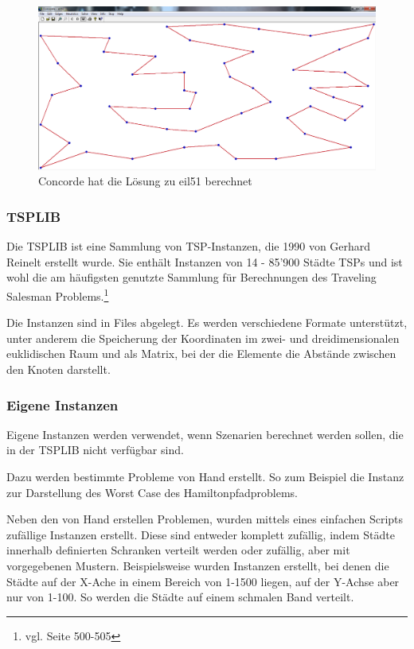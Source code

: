 \documentclass[11pt,a4paper]{article}
\begin{document}
\begin{figure}[H]
        \centering
        \includegraphics[width=14cm]{gfx/concorde_solution}
        \caption{Concorde hat die Lösung zu eil51 berechnet}
        \label{img:concorde_solution}
\end{figure}

\subsubsection{TSPLIB}
Die TSPLIB ist eine Sammlung von TSP-Instanzen, die 1990 von Gerhard Reinelt erstellt wurde. Sie enthält Instanzen von 14 - 85'900 Städte TSPs und ist wohl die am häufigsten genutzte Sammlung für Berechnungen des Traveling Salesman Problems.\footnote{vgl. \cite{applegate06} Seite 500-505}

Die Instanzen sind in Files abgelegt. Es werden verschiedene Formate unterstützt, unter anderem die Speicherung der Koordinaten im zwei- und dreidimensionalen euklidischen Raum und als Matrix, bei der die Elemente die Abstände zwischen den Knoten darstellt.

\subsubsection{Eigene Instanzen}
Eigene Instanzen werden verwendet, wenn Szenarien berechnet werden sollen, die in der TSPLIB nicht verfügbar sind.

Dazu werden bestimmte Probleme von Hand erstellt. So zum Beispiel die Instanz zur Darstellung des Worst Case des Hamiltonpfadproblems.

Neben den von Hand erstellen Problemen, wurden mittels eines einfachen Scripts zufällige Instanzen erstellt. Diese sind entweder komplett zufällig, indem Städte innerhalb definierten Schranken verteilt werden oder zufällig, aber mit vorgegebenen Mustern. Beispielsweise wurden Instanzen erstellt, bei denen die Städte auf der X-Ache in einem Bereich von 1-1500 liegen, auf der Y-Achse aber nur von 1-100. So werden die Städte auf einem schmalen Band verteilt.
\end{document}
